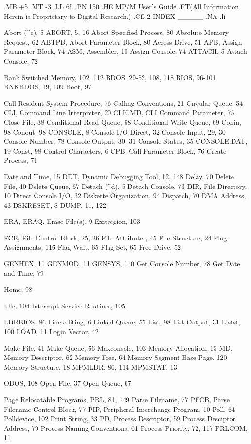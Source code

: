 .MB +5
.MT -3
.LL 65
.PN 150
.HE MP/M User's Guide
.FT(All Information Herein is Proprietary to Digital Research.)
.CE 2
INDEX
_____
.NA
.li

Abort (^c), 5
ABORT, 5, 16
Abort Specified Process, 80
Absolute Memory Request, 62
ABTPB, Abort Parameter Block, 80
Access Drive, 51
APB, Assign Parameter Block, 74
ASM, Assembler, 10
Assign Console, 74
ATTACH, 5
Attach Console, 72

Bank Switched Memory, 102, 112
BDOS, 29-52, 108, 118
BIOS, 96-101
BNKBDOS, 19, 109
Boot, 97

Call Resident System Procedure, 76
Calling Conventions, 21
Circular Queue, 54
CLI, Command Line Interpreter, 20
CLICMD, CLI Command Parameter, 75
Close File, 38
Conditional Read Queue, 68
Conditional Write Queue, 69
Conin, 98
Conout, 98
CONSOLE, 8
Console I/O Direct, 32
Console Input, 29, 30
Console Number, 78
Console Output, 30, 31
Console Status, 35
CONSOLE.DAT, 19
Const, 98
Control Characters, 6
CPB, Call Parameter Block, 76
Create Process, 71

Date and Time, 15
DDT, Dynamic Debugging Tool, 12, 148
Delay, 70
Delete File, 40
Delete Queue, 67
Detach (^d), 5
Detach Console, 73
DIR, File Directory, 10
Direct Console I/O, 32
Diskette Organization, 94
Dispatch, 70
DMA Address, 43
DSKRESET, 8
DUMP, 11, 122

ERA, ERAQ, Erase File(s), 9
Exitregion, 103

FCB, File Control Block, 25, 26
File Attributes, 45
File Structure, 24
Flag Assignments, 116
Flag Wait, 65
Flag Set, 65
Free Drive, 52

GENHEX, 11
GENMOD, 11
GENSYS, 110
Get Console Number, 78
Get Date and Time, 79

Home, 98

Idle, 104
Interrupt Service Routines, 105

LDRBIOS, 86
Line editing, 6
Linked Queue, 55
List, 98
List Output, 31
Listst, 100
LOAD, 11
Login Vector, 42

Make File, 41
Make Queue, 66
Maxconsole, 103
Memory Allocation, 15
MD, Memory Descriptor, 62
Memory Free, 64
Memory Segment Base Page, 120
Memory Structure, 18
MPMLDR, 86, 114
MPMSTAT, 13

ODOS, 108
Open File, 37
Open Queue, 67

Page Relocatable Programs, PRL, 81, 149
Parse Filename, 77
PFCB, Parse Filename Control Block, 77
PIP, Peripheral Interchange Program, 10
Poll, 64
Polldevice, 102
Print String, 33
PD, Process Descriptor, 59
Process Desciptor Address, 79
Process Naming Conventions, 61
Process Priority, 72, 117
PRLCOM, 11


